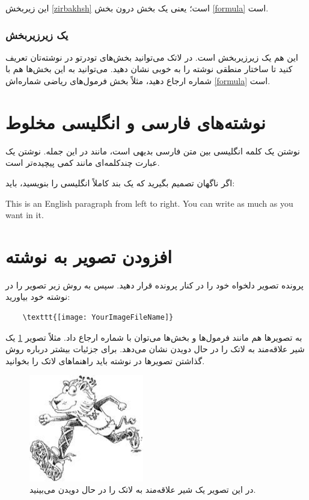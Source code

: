 این زیربخش \ref{zirbakhsh} است؛ یعنی یک بخش درون بخش \ref{formula} است.
\subsubsection{یک زیرزیربخش}
این هم یک زیرزیربخش است. در لاتک می‌توانید بخش‌های تودرتو در نوشته‌تان تعریف کنید تا ساختار منطقی نوشته را به خوبی نشان دهید. می‌توانید به این بخش‌ها هم با شماره ارجاع دهید، مثلاً بخش فرمول‌های ریاضی شماره‌اش \ref{formula} است.
\section{نوشته‌های فارسی و انگلیسی مخلوط}
نوشتن یک کلمه انگلیسی بین متن فارسی بدیهی است، مانند 
در این جمله.
نوشتن یک عبارت چندکلمه‌ای مانند
 کمی پیچیده‌تر است.

اگر ناگهان تصمیم بگیرید که یک بند کاملاً انگلیسی را بنویسید، باید:
\begin{latin}
	This is an English paragraph from left to right. You can write as much as you want in it.
\end{latin}
\section{افزودن تصویر به نوشته}
پرونده تصویر دلخواه خود را در کنار پرونده  قرار دهید. سپس به روش زیر تصویر را در نوشته خود بیاورید:
\begin{latin}
	\begin{verbatim}
	\texttt{[image: YourImageFileName]}
	\end{verbatim}
\end{latin}
به تصویرها هم مانند فرمول‌ها و بخش‌ها می‌توان با شماره ارجاع داد. مثلاً تصویر  \ref{fig:shir} یک شیر علاقه‌مند به لاتک را در حال دویدن نشان می‌دهد. برای جزئیات بیشتر درباره روش گذاشتن تصویرها در نوشته باید راهنماهای لاتک را بخوانید.
\begin{figure}%
	\centerline{\includegraphics[width=5cm]{Figures/Ch2/lion.jpg}}
	\caption{در این تصویر یک شیر علاقه‌مند به لاتک را در حال دویدن می‌بینید.}
	\label{fig:shir}
\end{figure}

